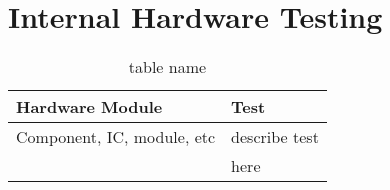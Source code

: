 \chapter{Internal Hardware Testing}
\label{chap: Internal Hardware Testing}


\begin{table}[h]
  \centering
  \begin{tabular}{|l|l|}
    \hline
    \textbf{Hardware Module}    &  \textbf{Test}  \\
    \hline
    Component, IC, module, etc  & describe test \\
                                &  here\\
    \hline
  \end{tabular}
  \caption{ table name}
  \label{tab:}
\end{table}
